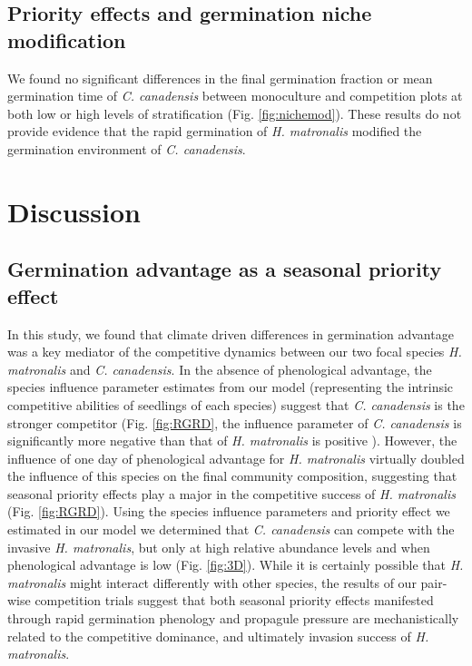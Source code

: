 \documentclass{article}\usepackage[]{graphicx}\usepackage[]{color}
\begin{document}
\subsection*{Priority effects and germination niche modification}
We found no significant differences in the final germination fraction or mean germination time of \textit {C. canadensis} between monoculture and competition plots at both low or high levels of stratification (Fig. \ref{fig:nichemod}). These results do not provide evidence that the rapid germination of \textit{H. matronalis} modified the germination environment of \textit{C. canadensis}. 

\section*{Discussion}

\subsection*{Germination advantage as a seasonal priority effect} 
In this study, we found that climate driven differences in germination advantage was a key mediator of the competitive dynamics between our two focal species \textit{H. matronalis} and \textit{C. canadensis}. In the absence of phenological advantage, the species influence parameter estimates from our model (representing the intrinsic competitive abilities of seedlings of each species) suggest that \textit{C. canadensis} is the stronger competitor (Fig. \ref{fig:RGRD}, the influence parameter of \textit{C. canadensis} is significantly more negative than that of \textit{H. matronalis} is positive ). However, the influence of one day of phenological advantage for \textit{H. matronalis} virtually doubled the influence of this species on the final community composition, suggesting that seasonal priority effects play a major in the competitive success of \textit{H. matronalis} (Fig. \ref{fig:RGRD}). Using the species influence parameters and priority effect we estimated in our model we determined that \textit{C. canadensis} can compete with the invasive \textit{H. matronalis}, but only at high relative abundance levels and when phenological advantage is low (Fig. \ref{fig:3D}). While it is certainly possible that \textit{H. matronalis} might interact differently with other species, the results of our pair-wise competition trials suggest that both seasonal priority effects manifested through rapid germination phenology and propagule pressure are mechanistically related to the competitive dominance, and ultimately invasion success of \textit{H. matronalis}.
\end{document}
